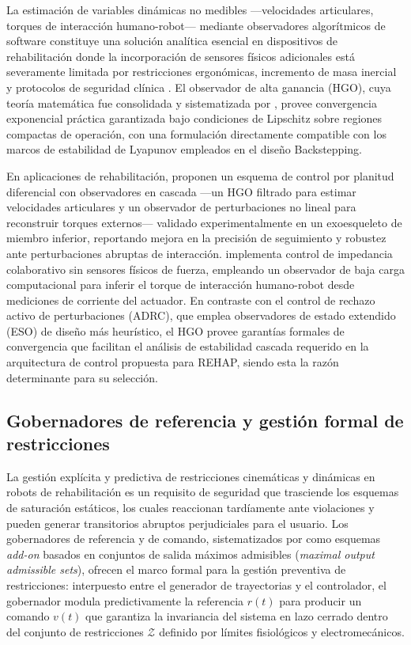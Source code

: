 \documentclass[a4paper,12pt]{article}
\begin{document}
La estimación de variables dinámicas no medibles ---velocidades articulares, torques de interacción humano-robot--- mediante observadores algorítmicos de software constituye una solución analítica esencial en dispositivos de rehabilitación donde la incorporación de sensores físicos adicionales está severamente limitada por restricciones ergonómicas, incremento de masa inercial y protocolos de seguridad clínica \citep{Brahmi2026}. El observador de alta ganancia (HGO), cuya teoría matemática fue consolidada y sistematizada por \citet{khalil2002nonlinear, khalil2017hgo}, provee convergencia exponencial práctica garantizada bajo condiciones de Lipschitz sobre regiones compactas de operación, con una formulación directamente compatible con los marcos de estabilidad de Lyapunov empleados en el diseño Backstepping.

En aplicaciones de rehabilitación, \citet{boubaker2025flatness} proponen un esquema de control por planitud diferencial con observadores en cascada ---un HGO filtrado para estimar velocidades articulares y un observador de perturbaciones no lineal para reconstruir torques externos--- validado experimentalmente en un exoesqueleto de miembro inferior, reportando mejora en la precisión de seguimiento y robustez ante perturbaciones abruptas de interacción. \citet{Brahmi2026} implementa control de impedancia colaborativo sin sensores físicos de fuerza, empleando un observador de baja carga computacional para inferir el torque de interacción humano-robot desde mediciones de corriente del actuador. En contraste con el control de rechazo activo de perturbaciones (ADRC), que emplea observadores de estado extendido (ESO) de diseño más heurístico, el HGO provee garantías formales de convergencia que facilitan el análisis de estabilidad cascada requerido en la arquitectura de control propuesta para REHAP, siendo esta la razón determinante para su selección.

\subsection{Gobernadores de referencia y gestión formal de restricciones}

La gestión explícita y predictiva de restricciones cinemáticas y dinámicas en robots de rehabilitación es un requisito de seguridad que trasciende los esquemas de saturación estáticos, los cuales reaccionan tardíamente ante violaciones y pueden generar transitorios abruptos perjudiciales para el usuario. Los gobernadores de referencia y de comando, sistematizados por \citet{garone2017reference} como esquemas \textit{add-on} basados en conjuntos de salida máximos admisibles (\textit{maximal output admissible sets}), ofrecen el marco formal para la gestión preventiva de restricciones: interpuesto entre el generador de trayectorias y el controlador, el gobernador modula predictivamente la referencia $r(t)$ para producir un comando $v(t)$ que garantiza la invariancia del sistema en lazo cerrado dentro del conjunto de restricciones $\mathcal{Z}$ definido por límites fisiológicos y electromecánicos.
\end{document}
